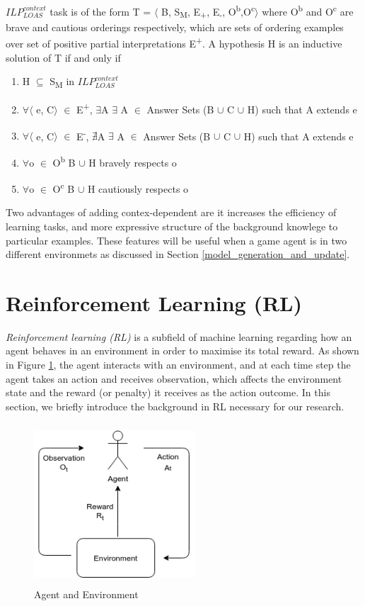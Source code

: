 \documentclass[12pt,twoside]{report}
\begin{document}
$ILP_{LOAS}^{context}$ task is of the form T = $\langle$ B, S\textsubscript{M}, E\textsubscript{+}, E\textsubscript{-}, O\textsuperscript{b},O\textsuperscript{c}$\rangle$ where O\textsuperscript{b} and O\textsuperscript{c} are brave and cautious orderings respectively, which are sets of ordering examples over set of positive partial interpretations E\textsuperscript{+}.
A hypothesis H is an inductive solution of T if and only if
\begin{enumerate}
\item H $\subseteq$ S\textsubscript{M} in $ILP_{LOAS}^{context}$
\item $\forall$$\langle$ e, C$\rangle$ $\in$ E\textsuperscript{+}, $\exists$A $\exists$ A $\in$ Answer Sets (B $\cup$ C $\cup$ H) such that A extends e
\item $\forall$$\langle$ e, C$\rangle$ $\in$ E\textsuperscript{-}, $\nexists$A $\exists$ A $\in$ Answer Sets (B $\cup$ C $\cup$ H) such that A extends e
\item $\forall$o $\in$ O\textsuperscript{b} B $\cup$ H bravely respects o
\item $\forall$o $\in$ O\textsuperscript{c} B $\cup$ H cautiously respects o
\end{enumerate}

Two advantages of adding contex-dependent are it increases the efficiency of learning tasks, and more expressive structure of the background knowlege to particular examples. These features will be useful when a game agent is in two different environmets as discussed in Section \ref{model_generation_and_update}.

\section{Reinforcement Learning (RL)}
\label{rl}
\textit{Reinforcement learning (RL)} is a subfield of machine learning regarding how an agent behaves in an environment in order to maximise its total reward. As shown in Figure \ref{agent_env}, the agent interacts with an environment, and at each time step the agent takes an action and receives observation, which affects the environment state and the reward (or penalty) it receives as the action outcome. In this section, we briefly introduce the background in RL necessary for our research.

\begin{figure}[!htb]
\centering
\includegraphics[width=6cm, height=6cm]{./figures/agent_env}
\caption{Agent and Environment}
\label{agent_env}
\end{figure}
\end{document}
